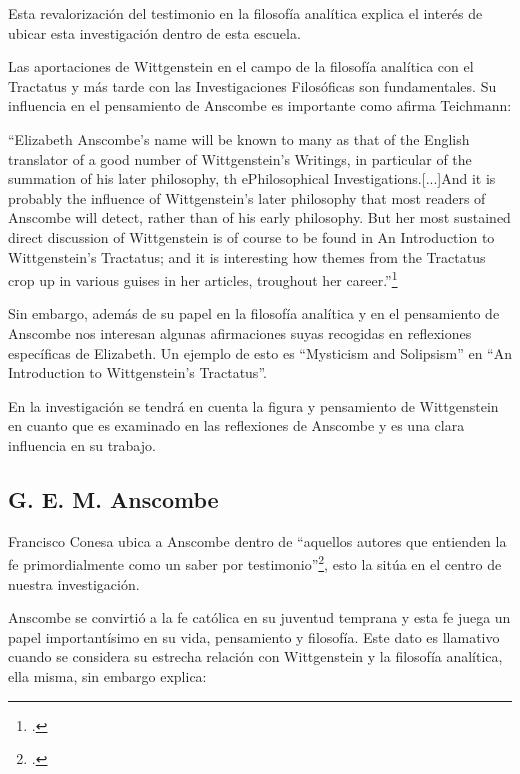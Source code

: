\documentclass[12pt]{article}
\begin{document}
{Esta revalorización del testimonio en la filosofía analítica explica el interés de ubicar esta investigación dentro de esta escuela. 

Las aportaciones de Wittgenstein en el campo de la filosofía analítica con el Tractatus y más tarde con las Investigaciones Filosóficas son fundamentales. Su influencia en el pensamiento de Anscombe es importante como afirma Teichmann:

``Elizabeth Anscombe's name will be known to many as that of the English translator of a good number of Wittgenstein's Writings, in particular of the summation of his later philosophy, th ePhilosophical Investigations.[...]And it is probably the influence of Wittgenstein's later philosophy that most readers of Anscombe will detect, rather than of his early philosophy. But her most sustained direct discussion of Wittgenstein is of course to be found in An Introduction to Wittgenstein's Tractatus; and it is interesting how themes from the Tractatus crop up in various guises in her articles, troughout her career.''\footcite[p.~191]{teichmann}

Sin embargo, además de su papel en la filosofía analítica y en el pensamiento de Anscombe nos interesan algunas afirmaciones suyas recogidas en reflexiones específicas de Elizabeth. Un ejemplo de esto es ``Mysticism and Solipsism'' en ``An Introduction to Wittgenstein's Tractatus''.

En la investigación se tendrá en cuenta la figura y pensamiento de Wittgenstein en cuanto que es examinado en las reflexiones de Anscombe y es una clara influencia en su trabajo.

\subsection{G. E. M. Anscombe}

Francisco Conesa ubica a Anscombe dentro de ``aquellos autores que entienden la fe primordialmente como un saber por testimonio''\footcite[p.~84]{cyc}, esto la sitúa en el centro de nuestra investigación. 

Anscombe se convirtió a la fe católica en su juventud temprana y esta fe juega un papel importantísimo en su vida, pensamiento y filosofía. Este dato es llamativo cuando se considera su estrecha relación con Wittgenstein y la filosofía analítica, ella misma, sin embargo explica:

}
\end{document}
